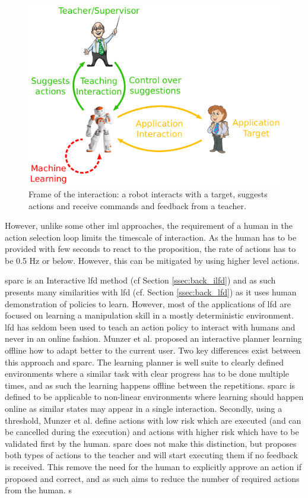 \begin{figure}[ht]
	\includegraphics[width=.8\linewidth]{frame.pdf}
	\centering
	\caption{Frame of the interaction: a robot interacts with a target, suggests actions and receive commands and feedback from a teacher.}
	\label{fig:frame}
\end{figure}

However, unlike some other \gls{iml} approaches, the requirement of a human in the action selection loop limits the timescale of interaction. As the human has to be provided with few seconds to react to the proposition, the rate of actions has to be 0.5 Hz or below. However, this can be mitigated by using higher level actions. %

\gls{sparc} is an Interactive \gls{lfd} method (cf Section \ref{ssec:back_ilfd}) and as such presents many similarities with \acrlong{lfd} (cf. Section \ref{ssec:back_lfd}) as it uses human demonstration of policies to learn. However, most of the applications of \gls{lfd} \citep{argall2009survey,billard2008robot} are focused on learning a manipulation skill in a mostly deterministic environment. \gls{lfd} has seldom been used to teach an action policy to interact with humans \citep{liu2014train,sequeira2016discovering,munzer2017efficient} and never in an online fashion. Munzer et al. proposed an interactive planner learning offline how to adapt better to the current user. Two key differences exist between this approach and \gls{sparc}. The learning planner is well suite to clearly defined environments where a similar task with clear progress has to be done multiple times, and as such the learning happens offline between the repetitions. \gls{sparc} is defined to be applicable to non-linear environments where learning should happen online as similar states may appear in a single interaction. Secondly, using a threshold, Munzer et al. define actions with low risk which are executed (and can be cancelled during the execution) and actions with higher risk which have to be validated first by the human. \gls{sparc} does not make this distinction, but proposes both types of actions to the teacher and will start executing them if no feedback is received. This remove the  need for the human to explicitly approve an action if proposed and correct, and as such aims to reduce the number of required actions from the human. s

